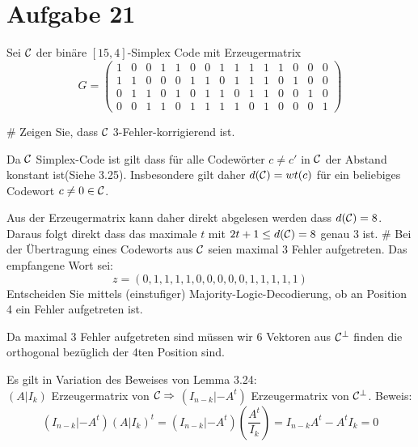 \section*{Aufgabe 21}
Sei $\mathcal{C}$ der binäre $[15,4]$-Simplex Code mit Erzeugermatrix
\begin{equation*}
	G = 
	\begin{pmatrix}
	1 & 0 & 0 & 1 & 1 & 0 & 0 & 1 & 1 & 1 & 1 & 1 & 0 & 0 & 0 \\
	1 & 1 & 0 & 0 & 0 & 1 & 1 & 0 & 1 & 1 & 1 & 0 & 1 & 0 & 0 \\
	0 & 1 & 1 & 0 & 1 & 0 & 1 & 1 & 0 & 1 & 1 & 0 & 0 & 1 & 0 \\
	0 & 0 & 1 & 1 & 0 & 1 & 1 & 1 & 1 & 0 & 1 & 0 & 0 & 0 & 1
	\end{pmatrix}
\end{equation*}
\begin{myList}
#
Zeigen Sie, dass $\mathcal{C}$ 3-Fehler-korrigierend ist.

Da $\mathcal{C}$ Simplex-Code ist gilt dass für alle Codewörter $c\neq c'$ in $\mathcal{C}$ der Abstand konstant ist(Siehe 3.25). Insbesondere gilt daher $d(\mathcal{C}) = wt(c)$ für ein beliebiges Codewort $c \neq 0 \in \mathcal{C}$.\medskip

Aus der Erzeugermatrix kann daher direkt abgelesen werden dass $d(\mathcal{C}) = 8$.
Daraus folgt direkt dass das maximale $t$ mit $2t+1 \leq d(\mathcal{C}) = 8$ genau 3 ist.
#
Bei der Übertragung eines Codeworts aus $\mathcal{C}$ seien maximal 3 Fehler aufgetreten. Das empfangene Wort sei:
\begin{equation*}
	z = (0,1,1,1,1,0,0,0,0,0,1,1,1,1,1)
\end{equation*}
Entscheiden Sie mittels (einstufiger) Majority-Logic-Decodierung, ob an Position 4 ein Fehler aufgetreten ist.\medskip

Da maximal 3 Fehler aufgetreten sind müssen wir 6 Vektoren aus $\mathcal{C}^\bot$ finden die orthogonal bezüglich der 4ten Position sind.\medskip

Es gilt in Variation des Beweises von Lemma 3.24:\\
$(A |I_k)$ Erzeugermatrix von $\mathcal{C} \Rightarrow$ $(I_{n-k}|-A^t)$ Erzeugermatrix von $\mathcal{C}^\bot$.
Beweis:
\begin{equation*}
	(I_{n-k}|-A^t) (A|I_k)^t = (I_{n-k}|-A^t)\left(\frac{A^t}{I_k}\right) = I_{n-k}A^t - A^tI_k = 0
\end{equation*}\medskip


\end{myList}
